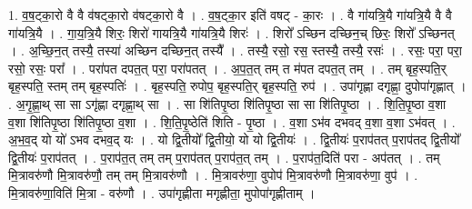 \documentclass[17pt]{extarticle}
\begin{document}
1. व॒ष॒ट्का॒रो वै वै व॑षट्का॒रो व॑षट्का॒रो वै । . व॒ष॒ट्का॒र इति॑ वषट् - का॒रः । . वै गा॑यत्रि॒यै गा॑यत्रि॒यै वै वै गा॑यत्रि॒यै । . गा॒य॒त्रि॒यै शिरः॒ शिरो॑ गायत्रि॒यै गा॑यत्रि॒यै शिरः॑ । . शिरो᳚ ऽच्छिन दच्छिन॒च् छिरः॒ शिरो᳚ ऽच्छिनत् । . अ॒च्छि॒न॒त् तस्यै॒ तस्या॑ अच्छिन दच्छिन॒त् तस्यै᳚ । . तस्यै॒ रसो॒ रस॒ स्तस्यै॒ तस्यै॒ रसः॑ । . रसः॒ परा॒ परा॒ रसो॒ रसः॒ परा᳚ । . परा॑पत दपत॒त् परा॒ परा॑पतत् । . अ॒प॒त॒त् तम् त म॑पत दपत॒त् तम् । . तम् बृह॒स्पति॒र् बृह॒स्पति॒ स्तम् तम् बृह॒स्पतिः॑ । . बृह॒स्पति॒ रुपोप॒ बृह॒स्पति॒र् बृह॒स्पति॒ रुप॑ । . उपा॑गृह्णा दगृह्णा॒ दुपोपा॑गृह्णात् । . अ॒गृ॒ह्णा॒थ् सा सा ऽगृ॑ह्णा दगृह्णा॒थ् सा । . सा शि॑तिपृ॒ष्ठा शि॑तिपृ॒ष्ठा सा सा शि॑तिपृ॒ष्ठा । . शि॒ति॒पृ॒ष्ठा व॒शा व॒शा शि॑तिपृ॒ष्ठा शि॑तिपृ॒ष्ठा व॒शा । . शि॒ति॒पृ॒ष्ठेति॑ शिति - पृ॒ष्ठा । . व॒शा ऽभ॑व दभवद् व॒शा व॒शा ऽभ॑वत् । . अ॒भ॒व॒द् यो यो॑ ऽभव दभव॒द् यः । . यो द्वि॒तीयो᳚ द्वि॒तीयो॒ यो यो द्वि॒तीयः॑ । . द्वि॒तीयः॑ प॒राप॑तत् प॒राप॑तद् द्वि॒तीयो᳚ द्वि॒तीयः॑ प॒राप॑तत् । . प॒राप॑त॒त् तम् तम् प॒राप॑तत् प॒राप॑त॒त् तम् । . प॒राप॑त॒दिति॑ परा - अप॑तत् । . तम् मि॒त्रावरु॑णौ मि॒त्रावरु॑णौ॒ तम् तम् मि॒त्रावरु॑णौ । . मि॒त्रावरु॑णा॒ वुपोप॑ मि॒त्रावरु॑णौ मि॒त्रावरु॑णा॒ वुप॑ । . मि॒त्रावरु॑णा॒विति॑ मि॒त्रा - वरु॑णौ । . उपा॑गृह्णीता मगृह्णीता॒ मुपोपा॑गृह्णीताम् । \newline
\end{document}
